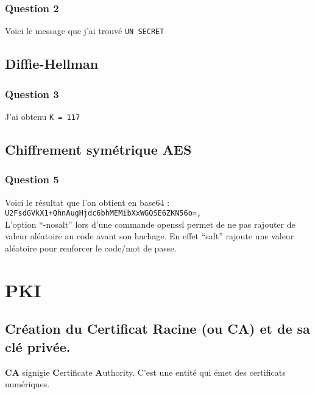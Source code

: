 \documentclass[12pt, a4paper]{article}
\begin{document}
    \subsubsection{Question 2}
    Voici le message que j'ai trouvé \texttt{UN SECRET}

    \subsection{Diffie-Hellman}
    \subsubsection{Question 3}
    J'ai obtenu \texttt{K = 117}

    \subsection{Chiffrement symétrique AES}
    \subsubsection{Question 5}
    Voici le résultat que l'on obtient en base64 : \\

    \texttt{U2FsdGVkX1+QhnAugHjdc6bhMEMibXxWGQSE6ZKN56o=,}\\

    L’option “-nosalt” lors d’une commande openssl permet de ne pas rajouter de valeur aléatoire au code avant son hachage. En effet “salt” rajoute une valeur aléatoire pour renforcer le code/mot de passe.

    \newpage
    \section{PKI}   
    \subsection{Création du Certificat Racine (ou CA) et de sa clé privée.}
    \textbf{CA} signigie \textbf{C}ertificate \textbf{A}uthority. C'est une entité qui émet des certificats numériques.\\
\end{document}
